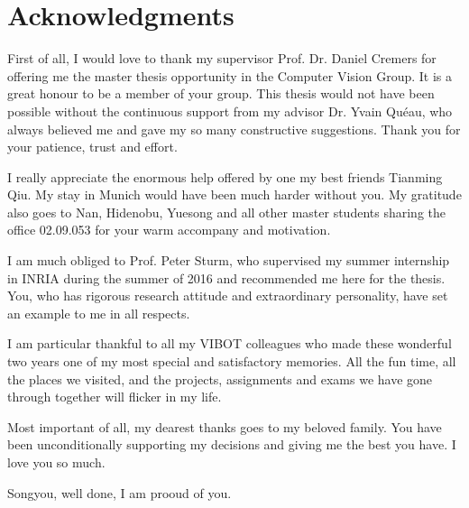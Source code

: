 \doublespacing

\setcounter{page}{1} \pagestyle{plain}


\tableofcontents

\listoffigures
\listoftables

\chapter*{Acknowledgments}
         {\protect{}}

First of all, I would love to thank my supervisor Prof. Dr. Daniel Cremers for offering me the master thesis opportunity in the Computer Vision Group. 
It is a great honour to be a member of your group. 
This thesis would not have been possible without the continuous support from my advisor Dr. Yvain Qu\'{e}au, who always believed me and gave my so many constructive suggestions. 
Thank you for your patience, trust and effort. 

I really appreciate the enormous help offered by one my best friends Tianming Qiu.
My stay in Munich would have been much harder without you.
My gratitude also goes to Nan, Hidenobu, Yuesong and all other master students sharing the office 02.09.053 for your warm accompany and motivation. 


I am much obliged to Prof. Peter Sturm, who supervised my summer internship in INRIA during the summer of 2016 and recommended me here for the thesis.
You, who has rigorous research attitude and extraordinary personality, have set an example to me in all respects.

I am particular thankful to all my VIBOT colleagues who made these wonderful two years one of my most special and satisfactory memories.
All the fun time, all the places we visited, and the projects, assignments and exams we have gone through together will flicker in my life.

Most important of all, my dearest thanks goes to my beloved family.
You have been unconditionally supporting my decisions and giving me the best you have. I love you so much.

Songyou, well done, I am prooud of you.

\pagestyle{fancy}
